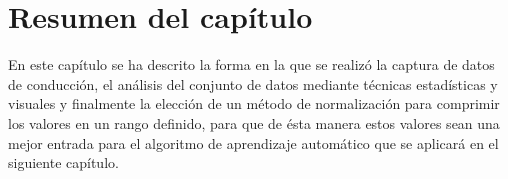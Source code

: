 \section{Resumen del cap\'{i}tulo}

En este cap\'{i}tulo se ha descrito la forma en la que se realiz\'{o} la captura de datos de conducci\'{o}n, el an\'{a}lisis del conjunto de datos mediante t\'{e}cnicas estad\'{i}sticas y visuales y finalmente la elecci\'{o}n de un m\'{e}todo de normalizaci\'{o}n para comprimir los valores en un rango definido, para que de \'{e}sta manera estos valores sean una mejor entrada para el algoritmo de aprendizaje autom\'{a}tico que se aplicar\'{a} en el siguiente cap\'{i}tulo.
 